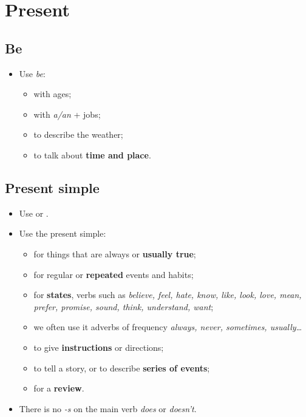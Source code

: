 \section{Present}

\subsection{Be}
\begin{itemize}
    \item Use \textit{be}:
    \begin{itemize}
        \item with ages;
        \item with \textit{a/an} + jobs;
        \item to describe the weather;
        \item to talk about \textbf{time and place}.
    \end{itemize}
\end{itemize}

\subsection{Present simple}
\begin{itemize}
    \item Use 
    or .
    \item Use the present simple:
    \begin{itemize}
        \item for things that are always or \textbf{usually true};
        \item for regular or \textbf{repeated} events and habits;
        \item for \textbf{states},  verbs such as
        \textit{believe, feel, hate, know, like, look, love, mean, prefer, promise, sound, think, understand, want};
        \item we often use it  adverbs of frequency \textit{always, never, sometimes, usually}\ldots
        \item[\daash] to give \textbf{instructions} or directions;
        \item[\daash] to tell a story, or to describe \textbf{series of events};
        \item[\daash] for a \textbf{review}.
    \end{itemize}
    \item There is no \textit{-s} on the main verb  \textit{does} or \textit{doesn't}.
\end{itemize}

